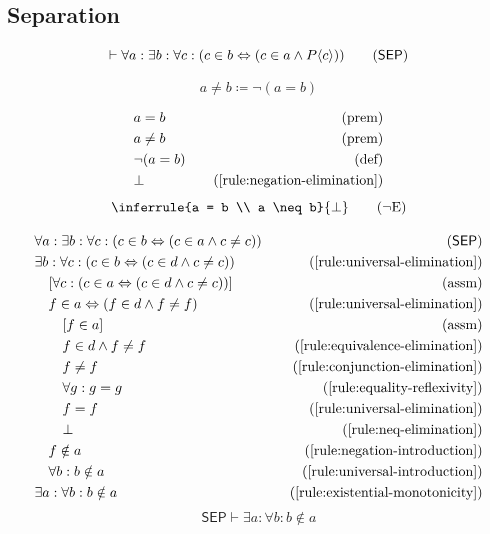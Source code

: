 \subsection{Separation}

\begin{foundation}
    \begin{equation}
        \vdash \forall a: \exists b: \forall c: (c \in b \lequiv (c \in a \wedge P\bound{c}))
        \tag{$\mathsf{SEP}$}
        \label{axiom:separation}
    \end{equation}
\end{foundation}

\begin{notation}
    \[a \neq b \coloneqq \neg (a = b)\]
\end{notation}

\begin{align*}
    \premise{a = b}\\
    \premise{a \neq b}\\
    \bydefinition{\neg (a = b)}\\
    \byrule{\bot}{\ref{rule:negation-elimination}}
\end{align*}
\begin{equation}
    \inferrule{a = b \\ a \neq b}{\bot}
    \tag{{$\neg$}E}
    \label{rule:neq-elimination}
\end{equation}

\begin{align*}
    \axiom{\forall a: \exists b: \forall c: (c \in b \lequiv (c \in a \wedge c \neq c))}{SEP}\\
    \byrule{\exists b: \forall c: (c \in b \lequiv (c \in d \wedge c \neq c))}{\ref{rule:universal-elimination}}\\
    \assumption[1]{\forall c: (c \in a \lequiv (c \in d \wedge c \neq c))}\\
    \byrule[1]{f \in a \lequiv (f \in d \wedge f \neq f)}{\ref{rule:universal-elimination}}\\
    \assumption[2]{f \in a}\\
    \byrule[2]{f \in d \wedge f \neq f}{\ref{rule:equivalence-elimination}}\\
    \byrule[2]{f \neq f}{\ref{rule:conjunction-elimination}}\\
    \byrule[2]{\forall g: g = g}{\ref{rule:equality-reflexivity}}\\
    \byrule[2]{f = f}{\ref{rule:universal-elimination}}\\
    \byrule[2]{\bot}{\ref{rule:neq-elimination}}\\
    \byrule[1]{f \notin a}{\ref{rule:negation-introduction}}\\
    \byrule[1]{\forall b: b \notin a}{\ref{rule:universal-introduction}}\\
    \byrule{\exists a: \forall b: b \notin a}{\ref{rule:existential-monotonicity}}\\
\end{align*}
\begin{equation}
    \mathsf{SEP} \vdash \exists a: \forall b: b \notin a
    \label{rule:empty-set-exists}
\end{equation}
